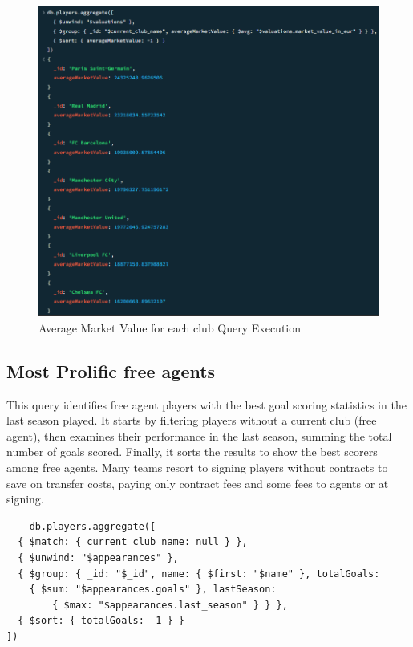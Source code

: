 \documentclass{Configuration_Files/PoliMi3i_thesis}
\begin{document}
\begin{figure}[htbp]
    \centering
    \includegraphics[scale=0.8]{Images/Queries/Average_market_value_club/amvc.png}
    \caption{Average Market Value for each club Query Execution}
\end{figure}

\subsection{Most Prolific free agents}

This query identifies free agent players with the best goal scoring statistics in the last season played. It starts by filtering players without a current club (free agent), then examines their performance in the last season, summing the total number of goals scored. Finally, it sorts the results to show the best scorers among free agents. Many teams resort to signing players without contracts to save on transfer costs, paying only contract fees and some fees to agents or at signing.

\begin{verbatim}
    db.players.aggregate([
  { $match: { current_club_name: null } },
  { $unwind: "$appearances" },
  { $group: { _id: "$_id", name: { $first: "$name" }, totalGoals: 
    { $sum: "$appearances.goals" }, lastSeason: 
        { $max: "$appearances.last_season" } } },
  { $sort: { totalGoals: -1 } }
])

\end{verbatim}
\end{document}
